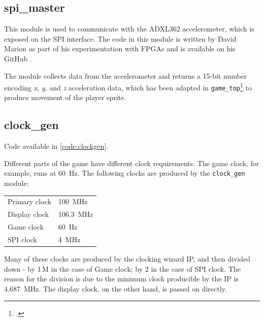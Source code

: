 \subsection{spi\_master}\label{sec:spi}
This module is used to communicate with the ADXL362 \cite{adxl362} accelerometer, which is exposed on the 
SPI interface. The code in this module is written by David Marion as part of his 
experimentation with FPGAs and is available on his GitHub \cite{fpgadudeacl}.

The module collects data from the accelerometer and returns a 15-bit number encoding \emph{x}, \emph{y}, and \emph{z} 
acceleration data, which has been adapted in \lstinline{game_top}\footnote{
    .
} to produce movement of the player sprite. 

\subsection{clock\_gen}
Code available in \cref{code:clockgen}.

Different parts of the game have different clock requirements. The game clock, for example, runs at \qty{60}{\Hz}. 
The following clocks are produced by the \lstinline|clock_gen| module:

    \begin{tabular}{l|l}
        Primary clock & \qty{100}{\MHz} \\
        Display clock & \qty{106.3}{\MHz} \\
        Game clock & \qty{60}{\Hz} \\
        SPI clock & \qty{4}{\MHz} \\ 
    \end{tabular}


Many of these clocks are produced by the clocking wizard IP, and then divided down - by 1\,M in the case of Game clock; by 2 
in the case of SPI clock. The reason for the division is due to the minimum clock producible by the IP is \qty{4.687}{\MHz}.
The display clock, on the other hand, is passed on directly.

